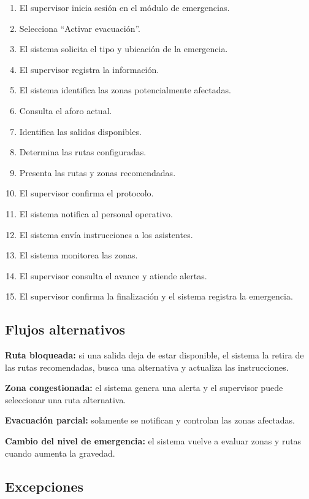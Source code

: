 \documentclass[12pt,a4paper]{article}
\begin{document}
\begin{enumerate}
\item El supervisor inicia sesión en el módulo de emergencias.
\item Selecciona ``Activar evacuación''.
\item El sistema solicita el tipo y ubicación de la emergencia.
\item El supervisor registra la información.
\item El sistema identifica las zonas potencialmente afectadas.
\item Consulta el aforo actual.
\item Identifica las salidas disponibles.
\item Determina las rutas configuradas.
\item Presenta las rutas y zonas recomendadas.
\item El supervisor confirma el protocolo.
\item El sistema notifica al personal operativo.
\item El sistema envía instrucciones a los asistentes.
\item El sistema monitorea las zonas.
\item El supervisor consulta el avance y atiende alertas.
\item El supervisor confirma la finalización y el sistema registra la emergencia.
\end{enumerate}

\subsection{Flujos alternativos}

\textbf{Ruta bloqueada:} si una salida deja de estar disponible, el sistema la retira de las rutas recomendadas, busca una alternativa y actualiza las instrucciones.

\textbf{Zona congestionada:} el sistema genera una alerta y el supervisor puede seleccionar una ruta alternativa.

\textbf{Evacuación parcial:} solamente se notifican y controlan las zonas afectadas.

\textbf{Cambio del nivel de emergencia:} el sistema vuelve a evaluar zonas y rutas cuando aumenta la gravedad.

\subsection{Excepciones}
\end{document}
